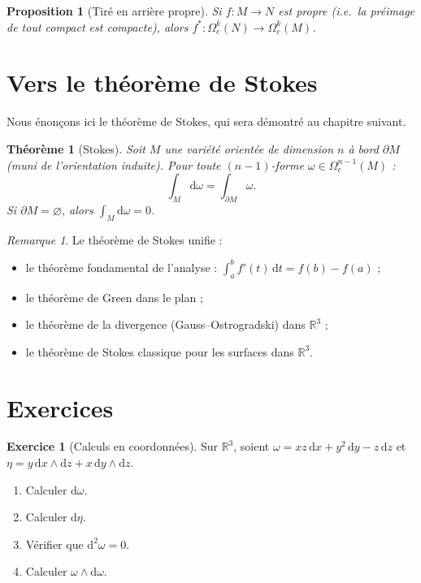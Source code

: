 \documentclass[12pt,a4paper,openany]{book}
\theoremstyle{definition}
\newtheorem{exercice}{Exercice}[chapter]
\theoremstyle{plain}
\newtheorem{theoreme}[definition]{Théorème}
\newtheorem{proposition}[definition]{Proposition}
\theoremstyle{remark}
\newtheorem{remarque}[definition]{Remarque}
\newcommand{\R}{\mathbb{R}}
\newcommand{\dd}{\mathrm{d}}
\begin{document}
\begin{proposition}[Tiré en arrière propre]\label{prop:pullback-propre}%
Si $f \colon M \to N$ est \emph{propre} (i.e.\ la préimage de tout
compact est compacte), alors
$f^* \colon \Omega^k_c(N) \to \Omega^k_c(M)$.
\end{proposition}

\section{Vers le théorème de Stokes}\label{sec:vers-stokes}

Nous énonçons ici le théorème de Stokes, qui sera démontré au chapitre
suivant.

\begin{theoreme}[Stokes]\label{thm:stokes-enonce}%
Soit $M$ une variété orientée de dimension $n$ à bord $\partial M$ (muni
de l'orientation induite). Pour toute $(n-1)$-forme
$\omega \in \Omega^{n-1}_c(M)$ :
\[
  \boxed{\int_M \dd\omega = \int_{\partial M} \omega.}
\]
Si $\partial M = \varnothing$, alors $\int_M \dd\omega = 0$.
\end{theoreme}

\begin{remarque}\label{rem:stokes-cas-particuliers}
Le théorème de Stokes unifie :
\begin{itemize}
  \item le théorème fondamental de l'analyse : $\int_a^b f'(t)\, \dd t =
    f(b) - f(a)$ ;
  \item le théorème de Green dans le plan ;
  \item le théorème de la divergence (Gauss--Ostrogradski) dans $\R^3$ ;
  \item le théorème de Stokes classique pour les surfaces dans $\R^3$.
\end{itemize}
\end{remarque}

\section{Exercices}\label{sec:exo-formes}

\begin{exercice}[Calculs en coordonnées]\label{exo:calculs-coordonnees}
Sur $\R^3$, soient $\omega = xz\,\dd x + y^2\,\dd y - z\,\dd z$ et
$\eta = y\,\dd x \wedge \dd z + x\,\dd y \wedge \dd z$.
\begin{enumerate}[label=\textup{(\alph*)}]
  \item Calculer $\dd\omega$.
  \item Calculer $\dd\eta$.
  \item Vérifier que $\dd^2\omega = 0$.
  \item Calculer $\omega \wedge \dd\omega$.
\end{enumerate}
\end{exercice}
\end{document}
